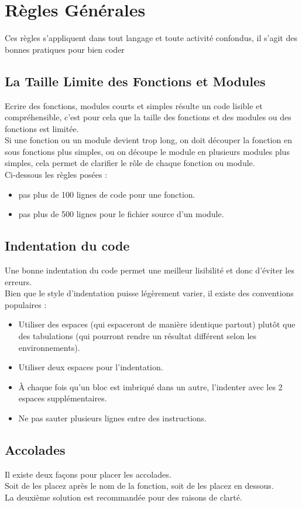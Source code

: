 \documentclass[11pt,fleqn]{book} %
\begin{document}
\section{Règles Générales}
Ces règles s’appliquent dans tout langage et toute activité confondus, il s’agit des bonnes pratiques pour bien coder
\subsection{ La Taille Limite des Fonctions et Modules}
Ecrire des fonctions, modules courts et simples résulte un code lisible et compréhensible, c’est pour cela que la taille des fonctions et des modules ou des fonctions est limitée. \\
Si une fonction ou un module devient trop long, on doit découper la fonction en sous fonctions plus simples, ou on découpe le module en plusieurs modules plus simples, cela permet de clarifier le rôle de chaque fonction ou module. \\
Ci-dessous les règles posées :
\begin{itemize}
    \item  pas plus de 100 lignes de code pour une fonction.
    \item  pas plus de 500 lignes pour le fichier source d’un module.
\end{itemize}
\subsection{Indentation du code}
Une bonne indentation du code permet une meilleur lisibilité et donc d'éviter les erreurs.\\
Bien que le style d'indentation puisse légèrement varier, il existe des conventions populaires :\\
\begin{itemize}
    \item     Utiliser des espaces (qui espaceront de manière identique partout) plutôt que des tabulations (qui pourront rendre un résultat différent selon les environnements).
    \item Utiliser deux espaces pour l'indentation.
    \item     À chaque fois qu'un bloc est imbriqué dans un autre, l'indenter avec les 2 espaces supplémentaires.
    \item     Ne pas sauter plusieurs lignes entre des instructions.
\end{itemize}


\subsection{Accolades}
 Il existe deux façons pour placer les accolades.\\
 Soit de les placez après le nom de la fonction, soit de les placez en dessous.\\
 La deuxième solution est recommandée pour des raisons de clarté.
\end{document}
